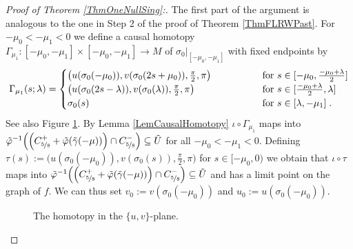 \documentclass[reqno]{article}
\begin{document}
\begin{proof}[Proof of Theorem \ref{ThmOneNullSing}:]
The first part of the argument is analogous to the one in Step 2 of the proof of Theorem \ref{ThmFLRWPast}. For $-\mu_0 < -\mu_1 <0$ we define a causal homotopy $\Gamma_{\mu_1} : [-\mu_0, -\mu_1] \times [-\mu_0, -\mu_1] \to M$  of $\sigma_0|_{[-\mu_0, -\mu_1]}$ with fixed endpoints by
\begin{equation*}
\Gamma_{\mu_1}(s ; \lambda) = \begin{cases} \big( u(\sigma_0(-\mu_0)), v(\sigma_0(2s + \mu_0)), \frac{\pi}{2}, \pi\big) \qquad \qquad &\textnormal{ for } s \in [-\mu_0, \frac{-\mu_0 + \lambda}{2}] \\
\big(u(\sigma_0(2s - \lambda)), v(\sigma_0(\lambda)), \frac{\pi}{2}, \pi\big) &\textnormal{ for } s \in [\frac{-\mu_0 + \lambda}{2}, \lambda] \\
\sigma_0(s) &\textnormal{ for } s \in [\lambda , - \mu_1] \;.
\end{cases}
\end{equation*}
See also Figure \ref{FigHomotopyNull}. By Lemma \ref{LemCausalHomotopy} $\iota \circ \Gamma_{\mu_1}$ maps into $\tilde{\varphi}^{-1}\Big(\Big(C^+_{\nicefrac{5}{8}} + \tilde{\varphi}(\tilde{\gamma}(-{\mu}))\Big) \cap C^-_{\nicefrac{5}{8}}\Big) \subseteq \tilde{U}$ for all $-\mu_0 < -\mu_1 <0$. Defining $\tau(s) := \big(u(\sigma_0(-\mu_0)), v(\sigma_0(s)), \frac{\pi}{2}, \pi\big)$ for $s \in [-\mu_0, 0)$ we obtain that $\iota \circ \tau$ maps into $\tilde{\varphi}^{-1}\Big(\Big(C^+_{\nicefrac{5}{8}} + \tilde{\varphi}(\tilde{\gamma}(-{\mu}))\Big) \cap C^-_{\nicefrac{5}{8}}\Big) \subseteq \tilde{U}$ and has a limit point on the graph of $f$. We can thus set $v_0 := v(\sigma_0(-\mu_0))$ and $u_0 := u(\sigma_0(-\mu_0))$.
\begin{figure}[h]
\centering
 \def\svgwidth{7cm}
   
      \caption{The homotopy in the $\{u,v\}$-plane.} \label{FigHomotopyNull}
\end{figure}
\newline


\end{proof}
\end{document}
